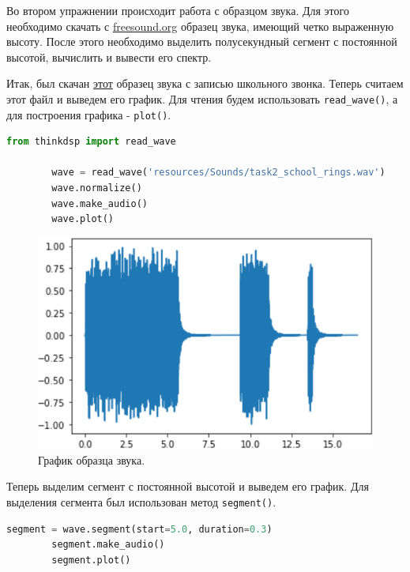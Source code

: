 \documentclass[a4paper, 14pt]{extarticle}
\begin{document}
    Во втором упражнении происходит работа с образцом звука.
    Для этого необходимо скачать с \href{https://freesound.org/}{freesound.org} образец звука, имеющий четко выраженную высоту.
    После этого необходимо выделить полусекундный сегмент с постоянной высотой, вычислить и вывести его спектр.

    Итак, был скачан \href{https://freesound.org/people/tosha73/sounds/509144/}{этот} образец звука с записью школьного звонка.
    Теперь считаем этот файл и выведем его график.
    Для чтения будем использовать \texttt{read\_wave()}, а для построения графика - \texttt{plot()}.

    \begin{lstlisting}[language=Python, caption= Чтение файла звука и вывод графика., label={lst:task2_reading_and_wave}]
        from thinkdsp import read_wave

        wave = read_wave('resources/Sounds/task2_school_rings.wav')
        wave.normalize()
        wave.make_audio()
        wave.plot()
    \end{lstlisting}

    \begin{figure}[h]
        \centering
        \includegraphics[width=0.8\linewidth]{resources/Images/task2_wave_sound}
        \caption{График образца звука.}
        \label{fig:task2_wave_sound}
    \end{figure}

    Теперь выделим сегмент с постоянной высотой и выведем его график.
    Для выделения сегмента был использован метод \texttt{segment()}.

    \begin{lstlisting}[language=Python, caption= Выделение сегмента и вывод его графика., label={lst:task2_segment}]
        segment = wave.segment(start=5.0, duration=0.3)
        segment.make_audio()
        segment.plot()
    \end{lstlisting}
\end{document}

